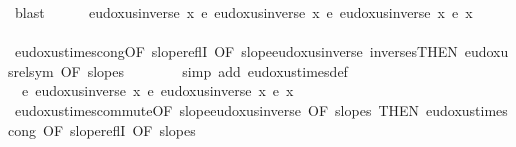 \begin{isabellebody}
\ blast\isanewline
\isanewline
\ \ \ \ \isamarkupfalse%
\ {\isachardoublequoteopen}eudoxus{\isacharunderscore}{\kern0pt}inverse\ x\ {\isasymsim}\isactrlsub e\ eudoxus{\isacharunderscore}{\kern0pt}inverse\ x\ {\isacharasterisk}{\kern0pt}\isactrlsub e\ {\isacharparenleft}{\kern0pt}eudoxus{\isacharunderscore}{\kern0pt}inverse\ x{\isacharprime}{\kern0pt}\ {\isacharasterisk}{\kern0pt}\isactrlsub e\ x{\isacharprime}{\kern0pt}{\isacharparenright}{\kern0pt}{\isachardoublequoteclose}\ \isanewline
\ \ \ \ \ \ \isamarkupfalse%
\ eudoxus{\isacharunderscore}{\kern0pt}times{\isacharunderscore}{\kern0pt}cong{\isacharbrackleft}{\kern0pt}OF\ slope{\isacharunderscore}{\kern0pt}reflI{\isacharcomma}{\kern0pt}\ OF\ slope{\isacharunderscore}{\kern0pt}eudoxus{\isacharunderscore}{\kern0pt}inverse\ inverses{\isacharparenleft}{\kern0pt}{}{\isacharparenright}{\kern0pt}{\isacharbrackleft}{\kern0pt}THEN\ eudoxus{\isacharunderscore}{\kern0pt}rel{\isacharunderscore}{\kern0pt}sym{\isacharbrackright}{\kern0pt}{\isacharcomma}{\kern0pt}\ OF\ slopes{\isacharparenleft}{\kern0pt}{}{\isacharparenright}{\kern0pt}{\isacharbrackright}{\kern0pt}\isanewline
\ \ \ \ \ \ \isamarkupfalse%
\ {\isacharparenleft}{\kern0pt}simp\ add{\isacharcolon}{\kern0pt}\ eudoxus{\isacharunderscore}{\kern0pt}times{\isacharunderscore}{\kern0pt}def{\isacharparenright}{\kern0pt}\isanewline
\ \ \ \ \isamarkupfalse%
\ \isamarkupfalse%
\ {\isachardoublequoteopen}{\isachardot}{\kern0pt}{\isachardot}{\kern0pt}{\isachardot}{\kern0pt}\ {\isasymsim}\isactrlsub e\ eudoxus{\isacharunderscore}{\kern0pt}inverse\ x{\isacharprime}{\kern0pt}\ {\isacharasterisk}{\kern0pt}\isactrlsub e\ {\isacharparenleft}{\kern0pt}eudoxus{\isacharunderscore}{\kern0pt}inverse\ x\ {\isacharasterisk}{\kern0pt}\isactrlsub e\ x{\isacharprime}{\kern0pt}{\isacharparenright}{\kern0pt}{\isachardoublequoteclose}\isanewline
\ \ \ \ \ \ \isamarkupfalse%
\ eudoxus{\isacharunderscore}{\kern0pt}times{\isacharunderscore}{\kern0pt}commute{\isacharbrackleft}{\kern0pt}OF\ slope{\isacharunderscore}{\kern0pt}eudoxus{\isacharunderscore}{\kern0pt}inverse{\isacharparenleft}{\kern0pt}{}{\isacharcomma}{\kern0pt}{}{\isacharparenright}{\kern0pt}{\isacharcomma}{\kern0pt}\ OF\ slopes{\isacharcomma}{\kern0pt}\ THEN\ eudoxus{\isacharunderscore}{\kern0pt}times{\isacharunderscore}{\kern0pt}cong{\isacharcomma}{\kern0pt}\ OF\ slope{\isacharunderscore}{\kern0pt}reflI{\isacharcomma}{\kern0pt}\ OF\ slopes{\isacharparenleft}{\kern0pt}{}{\isacharparenright}{\kern0pt}{\isacharbrackright}{\kern0pt}\ \isanewline

\end{isabellebody}

